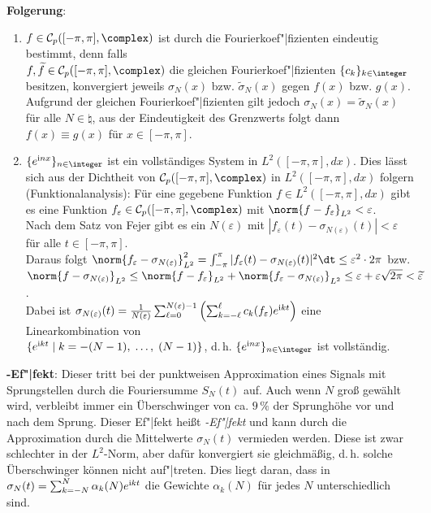 \textbf{Folgerung}:
\begin{enumerate}
    \item
    $f \in \C_p([-\pi, \pi], \complex)$ ist durch die Fourierkoef"|fizienten
    eindeutig bestimmt, denn falls\\
    $f, \widetilde{f} \in \C_p([-\pi, \pi], \complex)$
    die gleichen Fourierkoef"|fizienten
    $\{c_k\}_{k \in \integer}$ besitzen, konvergiert jeweils
    $\sigma_N(x)$ bzw. $\widetilde{\sigma}_N(x)$ gegen $f(x)$ bzw. $g(x)$.
    Aufgrund der gleichen Fourierkoef"|fizienten gilt jedoch
    $\sigma_N(x) = \widetilde{\sigma}_N(x)$ für alle $N \in \natural$,
    aus der Eindeutigkeit des Grenzwerts folgt dann $f(x) \equiv g(x)$
    für $x \in [-\pi, \pi]$.
    
    \item
    $\{e^{\i nx}\}_{n \in \integer}$ ist ein vollständiges System in
    $L^2([-\pi, \pi], dx)$.
    Dies lässt sich aus der Dichtheit von $\C_p([-\pi, \pi], \complex)$ in
    $L^2([-\pi, \pi], dx)$ folgern (Funktionalanalysis):
    Für eine gegebene Funktion $f \in L^2([-\pi, \pi], dx)$
    gibt es eine Funktion $f_\varepsilon \in \C_p([-\pi, \pi], \complex)$
    mit $\norm{f - f_\varepsilon}_{L^2} < \varepsilon$.\\
    Nach dem Satz von Fejer gibt es ein $N(\varepsilon)$ mit
    $|f_\varepsilon(t) - \sigma_{N(\varepsilon)}(t)| < \varepsilon$ für alle
    $t \in [-\pi, \pi]$.\\
    Daraus folgt
    $\norm{f_\varepsilon - \sigma_{N(\varepsilon)}}_{L^2}^2 =
    \int_{-\pi}^\pi |f_\varepsilon(t) - \sigma_{N(\varepsilon)}(t)|^2 \dt \le
    \varepsilon^2 \cdot 2\pi$ bzw.\\
    $\norm{f - \sigma_{N(\varepsilon)}}_{L^2} \le
    \norm{f - f_\varepsilon}_{L^2} +
    \norm{f_\varepsilon - \sigma_{N(\varepsilon)}}_{L^2} \le
    \varepsilon + \varepsilon \sqrt{2\pi} < \widetilde{\varepsilon}$.\\
    Dabei ist $\sigma_{N(\varepsilon)}(t) =
    \frac{1}{N(\varepsilon)} \sum_{\ell=0}^{N(\varepsilon)-1}
    \left(\sum_{k=-\ell}^\ell c_k(f_\varepsilon) e^{\mathrm{i} kt}\right)$
    eine Linearkombination von\\
    $\{e^{\mathrm{i} kt} \;|\; k = -(N-1),\; \dotsc,\; (N-1)\}$, d.\,h.
    $\{e^{\i nx}\}_{n \in \integer}$ ist vollständig.
\end{enumerate}

\linie

\textbf{-Ef"|fekt}:
Dieser tritt bei der punktweisen Approximation eines Signals mit
Sprungstellen durch die Fouriersumme $S_N(t)$ auf.
Auch wenn $N$ groß gewählt wird, verbleibt immer ein Überschwinger von ca.
$9\,\%$ der Sprunghöhe vor und nach dem Sprung.
Dieser Ef"|fekt heißt \emph{-Ef"|fekt} und kann durch die
Approximation durch die Mittelwerte $\sigma_N(t)$ vermieden werden.
Diese ist zwar schlechter in der $L^2$-Norm, aber dafür konvergiert sie
gleichmäßig, d.\,h. solche Überschwinger können nicht auf"|treten.
Dies liegt daran, dass in $\sigma_N(t) = \sum_{k=-N}^N \alpha_k(N) e^{\mathrm{i} kt}$
die Gewichte $\alpha_k(N)$ für jedes $N$ unterschiedlich sind.

